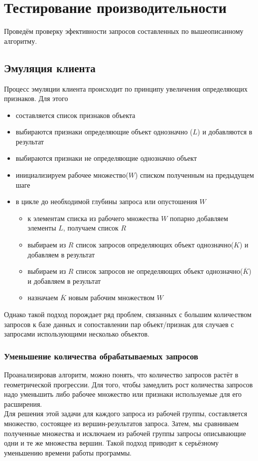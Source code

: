 \section{Тестирование производительности}
Проведём проверку эфективности запросов составленных по вышеописанному алгоритму.
\subsection{Эмуляция клиента}
Процесс эмуляции клиента происходит по принципу увеличения определяющих признаков. 
Для этого 
\begin{itemize}
\item составляется список признаков объекта
\item выбираются признаки определяющие объект однозначно ($L$) и добавляются в результат
\item выбираются признаки не определяющие однозначно объект
\item инициализируем рабочее множество($W$) списком полученным на предыдущем шаге
\item в цикле до необходимой глубины запроса или опустошения $W$
\begin{itemize}
\item к элементам списка из рабочего множества $W$ попарно добавляем элементы $L$, получаем список $R$
\item выбираем из $R$ список запросов определяющих объект однозначно($K$) и добавляем в результат
\item выбираем из $R$ список запросов не определяющих объект однозначно($\overline{K}$) и добавляем в результат
\item назначаем $\overline{K}$ новым рабочим множеством $W$
\end{itemize}
\end{itemize}
Однако такой подход порождает ряд проблем, связанных с большим количеством запросов к базе данных и сопоставлении пар объект/признак для случаев с запросами использующими несколько объектов.
\subsubsection{Уменьшение количества обрабатываемых запросов}
Проанализировав алгоритм, можно понять, что количество запросов растёт в геометрической прогрессии. Для того, чтобы замедлить рост количества запросов надо уменьшить либо рабочее множество или признаки используемые для его расширения.\\
Для решения этой задачи для каждого запроса из рабочей группы, составляется множество, состоящее из вершин-результатов запроса. Затем, мы сравниваем полученные множества и исключаем из рабочей группы запросы описывающие одни и те же множества вершин. Такой подход приводит к серьёзному уменьшению времени работы программы.
